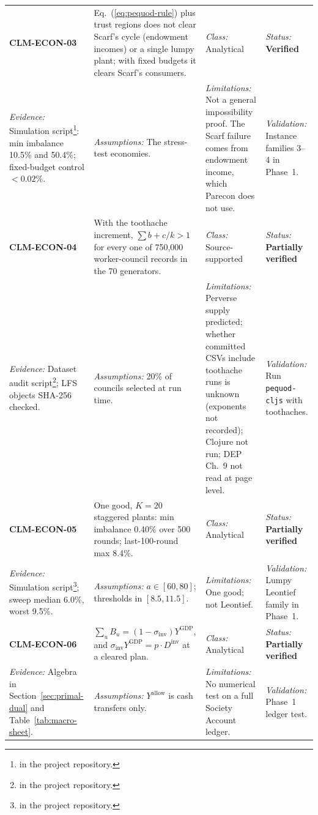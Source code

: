 \documentclass[10pt,twoside,openany]{book}
\theoremstyle{dpepstyle}
\begin{document}
{\begin{longtable}{L{0.92in} L{1.42in} L{1.07in} L{1.12in}}
\addlinespace[1pt]\midrule
\textbf{CLM-ECON-03} & Eq.~(\ref{eq:pequod-rule}) plus trust regions does not clear Scarf's cycle (endowment incomes) or a single lumpy plant; with fixed budgets it clears Scarf's consumers. & \emph{Class:} Analytical & \emph{Status:} \textbf{Verified} \\*
\emph{Evidence:} Simulation script\footnote{ in the project repository.}: min imbalance 10.5\% and 50.4\%; fixed-budget control $<0.02\%$. & \emph{Assumptions:} The stress-test economies. & \emph{Limitations:} Not a general impossibility proof. The Scarf failure comes from endowment income, which Parecon does not use. & \emph{Validation:} Instance families 3--4 in Phase~1. \\
\addlinespace[1pt]\midrule
\textbf{CLM-ECON-04} & With the toothache increment, $\sum b + c/k > 1$ for every one of 750,000 worker-council records in the 70 generators. & \emph{Class:} Source-supported & \emph{Status:} \textbf{Partially verified} \\*
\emph{Evidence:} Dataset audit script\footnote{ in the project repository.}; LFS objects SHA-256 checked. & \emph{Assumptions:} 20\% of councils selected at run time. & \emph{Limitations:} Perverse supply predicted; whether committed CSVs include toothache runs is unknown (exponents not recorded); Clojure not run; DEP Ch.~9 not read at page level. & \emph{Validation:} Run \texttt{pequod-cljs} with toothaches. \\
\addlinespace[1pt]\midrule
\textbf{CLM-ECON-05} & One good, $K=20$ staggered plants: min imbalance 0.40\% over 500 rounds; last-100-round max 8.4\%. & \emph{Class:} Analytical & \emph{Status:} \textbf{Partially verified} \\*
\emph{Evidence:} Simulation script\footnote{ in the project repository.}; sweep median 6.0\%, worst 9.5\%. & \emph{Assumptions:} $a\in[60,80]$; thresholds in $[8.5,11.5]$. & \emph{Limitations:} One good; not Leontief. & \emph{Validation:} Lumpy Leontief family in Phase~1. \\
\addlinespace[1pt]\midrule
\textbf{CLM-ECON-06} & $\sum_u B_u = (1-\sigma_{\text{inv}})Y^{\text{GDP}}$, and $\sigma_{\text{inv}}Y^{\text{GDP}} = p\cdot D^{\text{inv}}$ at a cleared plan. & \emph{Class:} Analytical & \emph{Status:} \textbf{Partially verified} \\*
\emph{Evidence:} Algebra in Section~\ref{sec:primal-dual} and Table~\ref{tab:macro-sheet}. & \emph{Assumptions:} $Y^{\text{allow}}$ is cash transfers only. & \emph{Limitations:} No numerical test on a full Society Account ledger. & \emph{Validation:} Phase~1 ledger test. \\

\end{longtable}}
\end{document}
